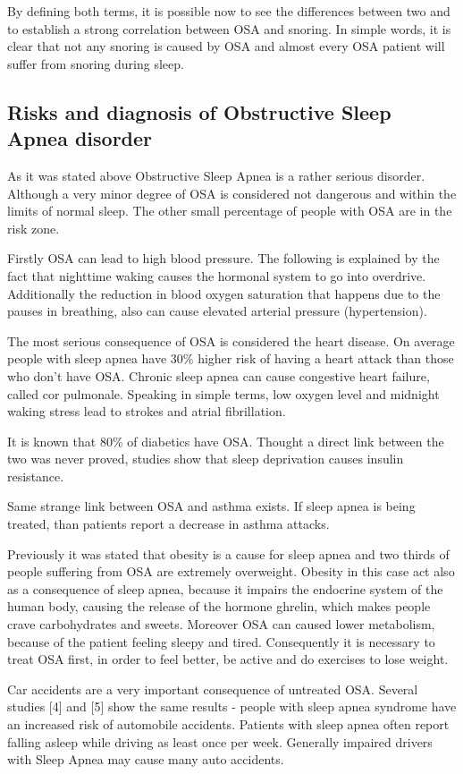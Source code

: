 \documentclass[12pt,a4paper]{report}
\begin{document}
By defining both terms, it is possible now to see the differences between two and to establish a strong correlation between OSA and snoring. In simple words, it is clear that not any snoring is caused by OSA and almost every OSA patient will suffer from snoring during sleep.

\subsection{Risks and diagnosis of Obstructive Sleep Apnea disorder}
As it was stated above Obstructive Sleep Apnea is a rather serious disorder. Although a very minor degree of OSA is considered not dangerous and within the limits of normal sleep. The other small percentage of people with OSA are in the risk zone.

Firstly OSA can lead to high blood pressure. The following is explained by the fact that nighttime waking causes the hormonal system to go into overdrive. Additionally the reduction in blood oxygen saturation that happens due to the pauses in breathing, also can cause elevated arterial pressure (hypertension).

The most serious consequence of OSA is considered the heart disease. On average people with sleep apnea have 30\% higher risk of having a heart attack than those who don't have OSA. Chronic sleep apnea can cause congestive heart failure, called cor pulmonale. Speaking in simple terms, low oxygen level and midnight waking stress lead to strokes and atrial fibrillation.

It is known that 80\% of diabetics have OSA. Thought a direct link between the two was never proved, studies show that sleep deprivation causes insulin resistance. 

Same strange link between OSA and asthma exists. If sleep apnea is being treated, than patients report a decrease in asthma attacks. 

Previously it was stated that obesity is a cause for sleep apnea and two thirds of people suffering from OSA are extremely overweight. Obesity in this case act also as a consequence of sleep apnea, because it impairs the endocrine system of the human body, causing the release of the hormone ghrelin, which makes people crave carbohydrates and sweets. Moreover OSA can caused lower metabolism, because of the patient feeling sleepy and tired. Consequently it is necessary to treat OSA first, in order to feel better, be active and do exercises to lose weight.

Car accidents are a very important consequence of untreated OSA. Several studies [4] and [5] show the same results - people with sleep apnea syndrome have an increased risk of automobile accidents. Patients with sleep apnea often report falling asleep while driving as least once per week. Generally impaired drivers with Sleep Apnea may cause many auto accidents. 
\end{document}
